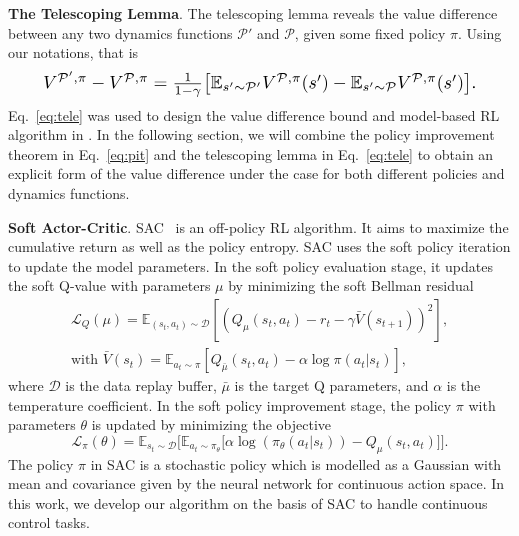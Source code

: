 \documentclass[letterpaper]{article} %
\def\E{{\mathbb{E}}}
\def\P{{\mathcal{P}}}
\begin{document}
\textbf{The Telescoping Lemma}.
The telescoping lemma \citep{luo2018algorithmic} reveals the value difference between any two dynamics functions $\P'$ and $\P$, given some fixed policy $\pi$. Using our notations, that is
\begin{equation}
\resizebox{.9\hsize}{!}{$
V^{\P',\pi}-V^{\P,\pi}=\frac{1}{1-\gamma}\big[
\E_{s'\sim\P'}V^{\P,\pi}(s')-\E_{s'\sim\P}V^{\P,\pi}(s')
\big].
$}
\label{eq:tele}
\end{equation}
Eq.~\eqref{eq:tele} was used to design the value difference bound and model-based RL algorithm in \citep{luo2018algorithmic}. In the following section, we will combine the policy improvement theorem in Eq.~\eqref{eq:pit} and the telescoping lemma in Eq.~\eqref{eq:tele} to obtain an explicit form of the value difference under the case for both different policies and dynamics functions.

\textbf{Soft Actor-Critic}.
SAC~\cite{haarnoja2018soft} is an off-policy RL algorithm. 
It aims to maximize the cumulative return as well as the policy entropy.
SAC uses the soft policy iteration to update the model parameters.
In the soft policy evaluation stage, it updates the soft Q-value with parameters $\mu$ by minimizing the soft Bellman residual
\begin{equation}
\begin{aligned}
    \mathcal{L}_Q(\mu) = \E_{(s_t, a_t) \sim \mathcal{D}} \left[( Q_{\mu}(s_t, a_t) - r_t - \gamma \bar{V}(s_{t+1}))^2\right], \\
    \text{with } \bar{V}(s_t) = \E_{a_t \sim \pi} \left[Q_{\bar{\mu}}(s_t, a_t) - \alpha \log \pi(a_t|s_t)\right],
\end{aligned}
\label{eq:soft_q}
\end{equation}
where $\mathcal{D}$ is the data replay buffer, $\bar{\mu}$ is the target Q parameters, and $\alpha$ is the temperature coefficient. 
In the soft policy improvement stage, the policy $\pi$ with parameters $\theta$ is updated by minimizing the objective
\begin{equation}
    \mathcal{L}_{\pi}(\theta) = \E_{s_t \sim \mathcal{D}} \bigg[ 
    \E_{a_t \sim \pi_{\theta}} \big[\alpha \log(\pi_{\theta}(a_t|s_t)) - Q_{\mu}(s_t, a_t)\big]
    \bigg].
\label{eq:ori_sac}
\end{equation}
The policy $\pi$ in SAC is a stochastic policy which is modelled as a Gaussian with mean and covariance given by the neural network for continuous action space. 
In this work, we develop our algorithm on the basis of SAC to handle continuous control tasks.
\end{document}
